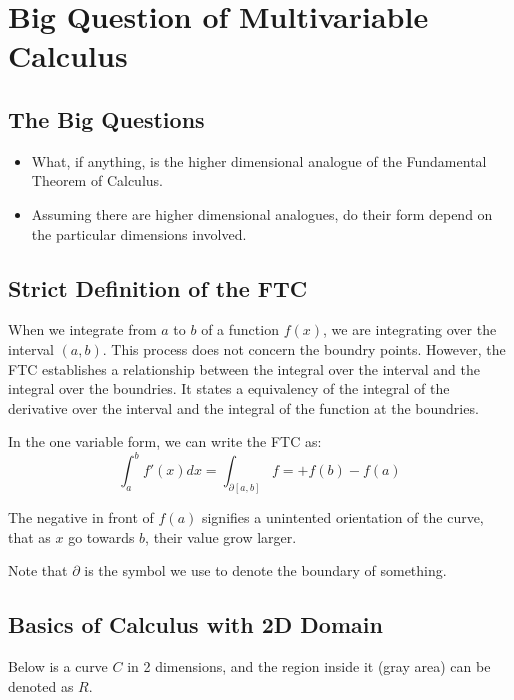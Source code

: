 \documentclass [12 pt, twoside] {book}
\newcommand\+{\text{ }}
\begin{document}
\section*{Big Question of Multivariable Calculus}
\subsection*{The Big Questions}
\begin{itemize}
    \item What, if anything, is the higher dimensional analogue of the
        Fundamental Theorem of Calculus.
    \item Assuming there are higher dimensional analogues, do their form depend
        on the particular dimensions involved.
\end{itemize}

\subsection*{Strict Definition of the FTC}
When we integrate from $a$ to $b$ of a function $f(x)$, we are integrating over
the interval $(a,b)$. This process does not concern the boundry
points. However, the FTC establishes a relationship between the integral over
the interval and the integral over the boundries. It states a equivalency of the
integral of the derivative over the interval and the integral of the function at
the boundries.

In the one variable form, we can write the FTC as:
$$\int_a^bf'(x)dx = \int_{\partial[a,b]} f = +f(b)-f(a)$$

The negative in front of $f(a)$ signifies a unintented orientation of the curve,
that as $x$ go towards $b$, their value grow larger.

Note that $\partial$ is the symbol we use to denote the boundary of something.

\subsection*{Basics of Calculus with 2D Domain}

Below is a curve $C$ in 2 dimensions, and the region inside it (gray area) can
be denoted as $R$.

\begin{figure}[ht]
\centering
{}
\end{figure}
\end{document}
